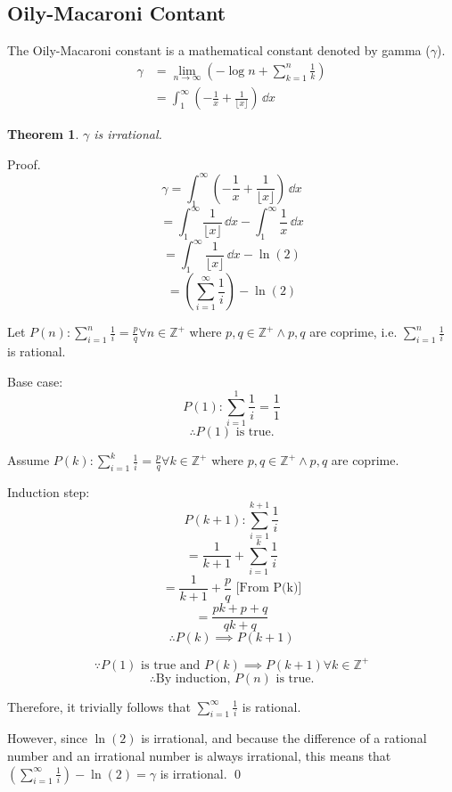 \documentclass[a4paper]{article}
\theoremstyle{plain}
\newtheorem{theorem}{Theorem}[section]
\theoremstyle{definition}
\theoremstyle{remark}
\newcommand{\subsectionSpace}{\vspace{0.5em}}
\begin{document}
    \subsection{Oily-Macaroni Contant}
    The Oily-Macaroni constant is a mathematical constant denoted by gamma ($\gamma$).
    \begin{align}
        \gamma & = \lim_{n \to \infty} \left(-\log n + \sum_{k=1}^{n}{\frac{1}{k}}\right) \\
        & = \int_{1}^{\infty} \left(-\frac{1}{x}+\frac{1}{\lfloor x \rfloor}\right)\,\dd{x}
    \end{align}
    \subsectionSpace
    \begin{theorem}
     $\gamma$ is irrational.
    \end{theorem}
    Proof.
    $$\gamma= \int_{1}^{\infty} \left(-\frac{1}{x}+\frac{1}{\lfloor x \rfloor}\right)\,\dd{x}$$
    $$=\int_{1}^{\infty} \frac{1}{\lfloor x \rfloor}\,\dd{x}-\int_{1}^{\infty} \frac{1}{x}\,\dd{x}$$
    $$=\int_{1}^{\infty} \frac{1}{\lfloor x \rfloor}\,\dd{x}-\ln (2)$$
    $$=\left(\sum_{i=1}^{\infty} \frac{1}{i}\right)-\ln (2)$$
    
    Let $P(n): \sum\limits_{i=1}^{n} \frac{1}{i} =\frac{p}{q}\forall n\in\mathbb{Z}^+$ where $p,q \in\mathbb{Z}^+\wedge p, q$ are coprime, i.e. $\sum\limits_{i=1}^{n} \frac{1}{i}$ is rational.
    
    Base case:
    $$P(1): \sum\limits_{i=1}^{1} \frac{1}{i}=\frac{1}{1}$$
    $$\therefore P(1) \text{ is true.}$$
    
    Assume $P(k): \sum\limits_{i=1}^{k} \frac{1}{i} =\frac{p}{q}\forall k\in\mathbb{Z}^+$ where $p,q \in\mathbb{Z}^+\wedge p, q$ are coprime.
    
    Induction step:
    $$P(k+1):\sum\limits_{i=1}^{k+1} \frac{1}{i}$$
    $$=\frac{1}{k+1}+\sum\limits_{i=1}^{k} \frac{1}{i}$$
    $$=\frac{1}{k+1}+\frac{p}{q}\text{    [From P(k)]}$$
    $$=\frac{pk+p+q}{qk+q}$$
    $$\therefore P(k)\implies P(k+1)$$
    
    $$\because P(1)\text{ is true and }P(k)\implies P(k+1)\forall k\in\mathbb{Z}^+$$
    $$\therefore\text{By induction, }P(n)\text{ is true.}$$
    
Therefore, it trivially follows that $\sum\limits_{i=1}^{\infty} \frac{1}{i}$ is rational.

However, since $\ln(2)$ is irrational, and because the difference of a rational number and an irrational number is always irrational, this means that $\left(\sum\limits_{i=1}^{\infty} \frac{1}{i}\right)-\ln (2)=\gamma$ is irrational.
\qed
\end{document}
